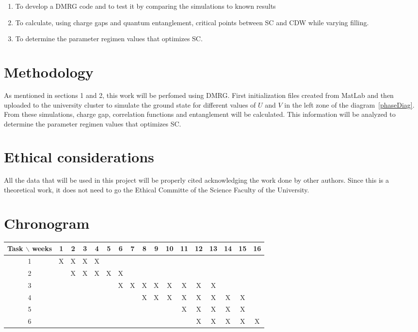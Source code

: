 \documentclass{article}
\begin{document}
\begin{enumerate}
    \item To develop a DMRG code and to test it by comparing the simulations to known results
    \item  To calculate, using charge gaps and quantum entanglement, critical points between SC and CDW while varying filling.
    \item To determine the parameter regimen values that optimizes SC.
\end{enumerate}

\section{Methodology}

As mentioned in sections 1 and 2, this work will be perfomed using DMRG. First initialization files created from MatLab and then uploaded to the university cluster to simulate the ground state for different values of $U$ and $V$ in the left zone of the diagram~\ref{phaseDiag}. From these simulations, charge gap, correlation functions and entanglement will be calculated. This information will be analyzed to determine the parameter regimen values that optimizes SC.

\section{Ethical considerations}

All the data that will be used in this project will be properly cited acknowledging the work done by other authors. Since this is a theoretical work, it does not need to go the Ethical Committe of the Science Faculty of the University.

\section{Chronogram}

\begin{table}[htb]
	\begin{tabular}{|c|cccccccccccccccc| }
	\hline
	Task $\backslash$ weeks & 1 & 2 & 3 & 4 & 5 & 6 & 7 & 8 & 9 & 10 & 11 & 12 & 13 & 14 & 15 & 16  \\
	\hline
	1 & X & X & X & X &   &   &   &  &  &   &   &   &   &   &   &   \\
	2 &   & X & X & X  & X & X &  &   &   &  &  &  &   &  &  &   \\
	3 &   &   &   &   &   & X  & X  & X & X  & X  & X  & X &  X &   &  &   \\
	4 &  &  &  &  &  &  &  & X & X & X &  X & X  &  X & X  &  X &   \\
	5 &   &   &   &   &  &   &   &   &  & &  X & X &  X & X & X &   \\
	6 &   &   &   &   &  &   &   &   &  &   &   & X &  X & X  & X & X  \\
	\hline
	\end{tabular}
\end{table}
\vspace{1mm}
\end{document}
